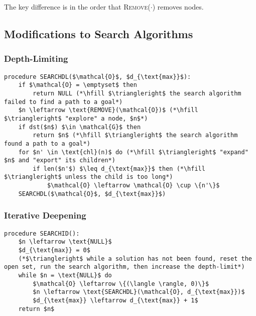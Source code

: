 \begin{warning}
    The key difference is in the order that \textsc{Remove}($\cdot$) removes nodes.
\end{warning}

\subsection{Modifications to Search Algorithms}
\subsubsection{Depth-Limiting}
\begin{algo}
\begin{lstlisting}
procedure SEARCHDL($\mathcal{O}$, $d_{\text{max}}$):
    if $\mathcal{O} = \emptyset$ then
        return NULL (*\hfill $\triangleright$ the search algorithm failed to find a path to a goal*)
    $n \leftarrow \text{REMOVE}(\mathcal{O})$ (*\hfill $\triangleright$ "explore" a node, $n$*)
    if dst($n$) $\in \mathcal{G}$ then
        return $n$ (*\hfill $\triangleright$ the search algorithm found a path to a goal*)
    for $n' \in \text{chl}(n)$ do (*\hfill $\triangleright$ "expand" $n$ and "export" its children*)
        if len($n'$) $\leq d_{\text{max}}$ then (*\hfill $\triangleright$ unless the child is too long*)
            $\mathcal{O} \leftarrow \mathcal{O} \cup \{n'\}$
    SEARCHDL($\mathcal{O}$, $d_{\text{max}}$)
\end{lstlisting}

\end{algo}

\subsubsection{Iterative Deepening}
\begin{algo}
\begin{lstlisting}
procedure SEARCHID():
    $n \leftarrow \text{NULL}$
    $d_{\text{max}} = 0$
    (*$\triangleright$ while a solution has not been found, reset the open set, run the search algorithm, then increase the depth-limit*)
    while $n = \text{NULL}$ do
        $\mathcal{O} \leftarrow \{(\langle \rangle, 0)\}$
        $n \leftarrow \text{SEARCHDL}(\mathcal{O}, d_{\text{max}})$
        $d_{\text{max}} \leftarrow d_{\text{max}} + 1$
    return $n$
\end{lstlisting}
    
\end{algo}

